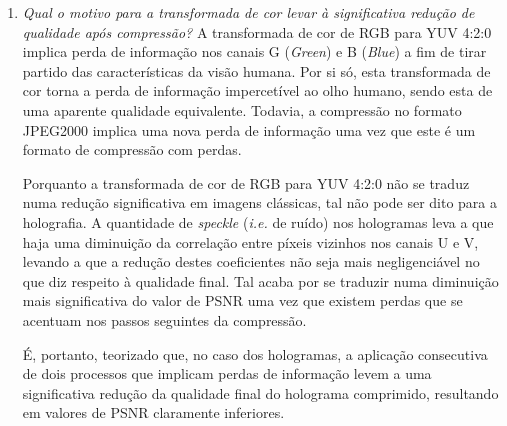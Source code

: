 \begin{enumerate}
    \item \textit{Qual o motivo para a transformada de cor levar à significativa redução de qualidade após compressão?}\newline
    A transformada de cor de \ac{RGB} para YUV 4:2:0 implica perda de informação nos canais G (\textit{Green}) e B (\textit{Blue}) a fim de tirar partido das características da visão humana. Por si só, esta transformada de cor torna a perda de informação impercetível ao olho humano, sendo esta de uma aparente qualidade equivalente.\newline
    Todavia, a compressão no formato JPEG2000 implica uma nova perda de informação uma vez que este é um formato de compressão com perdas.\newline
    
    


    Porquanto a transformada de cor de RGB para YUV 4:2:0 não se traduz numa redução significativa em imagens clássicas, tal não pode ser dito para a holografia. A quantidade de \textit{speckle} (\textit{i.e.} de ruído) nos hologramas leva a que haja uma diminuição da correlação %
    entre píxeis vizinhos nos canais U e V, levando a que a redução destes coeficientes não seja mais negligenciável no que diz respeito à qualidade final. Tal acaba por se traduzir numa diminuição mais significativa do valor de \ac{PSNR} uma vez que existem perdas que se acentuam nos passos seguintes da compressão.

    É, portanto, teorizado que, no caso dos hologramas, a aplicação consecutiva de dois processos que implicam perdas de informação levem a uma significativa redução da qualidade final do holograma comprimido, resultando em valores de \ac{PSNR} claramente inferiores.


\end{enumerate}
